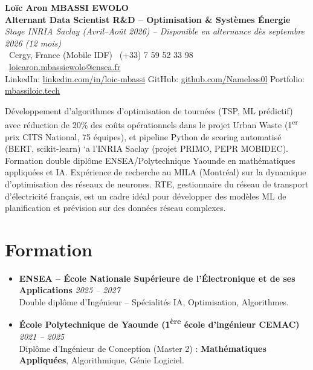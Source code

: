 \documentclass[a4paper,11pt]{article}
\begin{document}
\begin{center}
    {\Large \textbf{Lo\"ic Aron MBASSI EWOLO}} \\ \vspace{4pt}
    \textbf{\large Alternant Data Scientist R\&D -- Optimisation \& Syst\`emes \'Energie} \\
    \textit{\small Stage INRIA Saclay (Avril--Ao\^ut 2026) -- Disponible en alternance d\`es septembre 2026 (12 mois)} \\ \vspace{4pt}
    \small
    \Pointinghand\ Cergy, France (Mobile IDF) \quad \Mobilefone\ (+33) 7 59 52 33 98 \quad
    {\color{primary}\Letter\ \href{mailto:loicaron.mbassiewolo@ensea.fr}{loicaron.mbassiewolo@ensea.fr}} \\ \vspace{2pt}
    {\color{primary}LinkedIn: \href{https://www.linkedin.com/in/loic-mbassi/}{linkedin.com/in/loic-mbassi}} \quad
    {\color{primary}GitHub: \href{https://github.com/Nameless0l}{github.com/Nameless0l}} \quad
    {\color{primary}Portfolio: \href{https://mbassiloic.tech}{mbassiloic.tech}}
\end{center}
\vspace{-6pt}
\noindent\small{D\'eveloppement d'algorithmes d'optimisation de tourn\'ees (TSP, ML pr\'edictif) avec r\'eduction de 20\% des co\^uts op\'erationnels dans le projet Urban Waste (1\textsuperscript{er} prix CITS National, 75 \'equipes), et pipeline Python de scoring automatis\'e (BERT, scikit-learn) `a l'INRIA Saclay (projet PRIMO, PEPR MOBIDEC). Formation double dipl\^ome ENSEA/Polytechnique Yaounde en math\'ematiques appliqu\'ees et IA. Exp\'erience de recherche au MILA (Montr\'eal) sur la dynamique d'optimisation des r\'eseaux de neurones. RTE, gestionnaire du r\'eseau de transport d'\'electricit\'e fran\c cais, est un cadre id\'eal pour d\'evelopper des mod\`eles ML de planification et pr\'evision sur des donn\'ees r\'eseau complexes.}

\section{Formation}
\begin{itemize}[leftmargin=*, label=\tiny$\bullet$, nosep]
    \item \textbf{ENSEA -- \'Ecole Nationale Sup\'erieure de l'\'Electronique et de ses Applications} \hfill \textit{2025 -- 2027} \\
    \small{Double dipl\^ome d'Ing\'enieur -- Sp\'ecialit\'es IA, Optimisation, Algorithmes.}
    \item \textbf{\'Ecole Polytechnique de Yaounde (1\textsuperscript{\`ere} \'ecole d'ing\'enieur CEMAC)} \hfill \textit{2021 -- 2025} \\
    \small{Dipl\^ome d'Ing\'enieur de Conception (Master 2) : \textbf{Math\'ematiques Appliqu\'ees}, Algorithmique, G\'enie Logiciel.}
\end{itemize}
\end{document}
